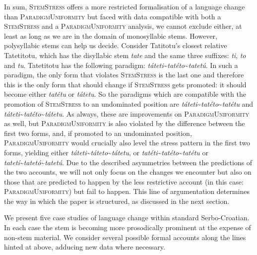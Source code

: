 \documentclass[output=paper,modfonts,nonflat
]{langsci/langscibook}
\begin{document}
In sum, \textsc{StemStress} offers a more restricted formalisation of a language change than \textsc{ParadigmUniformity} but faced with data compatible with both a \textsc{StemStress} and a \textsc{ParadigmUniformity} analysis, we cannot exclude either, at least as long as we are in the domain of monosyllabic stems. However, polysyllabic stems can help us decide. Consider Tatitotu's closest relative Tatetitotu, which has the disyllabic stem \textit{tate} and the same three suffixes: \textit{ti}, \textit{to} and \textit{tu}. Tatetitotu has the following paradigm:  \textit{táteti}\textasciitilde{}\textit{tatéto}\textasciitilde{}\textit{tatetú}. In such a paradigm, the only form that violates \textsc{StemStress}  is the last one and therefore this is the only form that should change if \textsc{StemStress} gets promoted: it should become either \textit{tatétu} or \textit{tátetu}. So the paradigms which are compatible with the promotion of \textsc{StemStress} to an undominated position are \textit{táteti}\textasciitilde{}\textit{tatéto}\textasciitilde{}\textit{tatétu} and \textit{táteti}\textasciitilde{}\textit{tatéto}\textasciitilde{}\textit{tátetu}. As always, these are improvements on \textsc{ParadigmUni\-formity} as well, but \textsc{ParadigmUniformity} is also violated by the difference between the first two forms, and, if promoted to an undominated position, \textsc{ParadigmUniformity} would crucially also level the stress pattern in the first two forms, yielding either \textit{táteti}\textasciitilde{}\textit{táteto}\textasciitilde{}\textit{tátetu}, or \textit{tatéti}\textasciitilde{}\textit{tatéto}\textasciitilde{}\textit{tatétu} or \textit{tatetí}\textasciitilde{}\textit{tatetó}\textasciitilde{}\textit{tatetú}. Due to the described asymmetries between the predictions of the two accounts, we will not only focus on the changes we encounter but also on those that are predicted to happen by the less restrictive account (in this case: \textsc{ParadigmUniformity}) but fail to happen. This line of argumentation determines the way in which the paper is structured, as discussed in the next section. 

We present five case studies of language change within standard Serbo-Croatian. In each case the stem is becoming more prosodically prominent at the expense of non-stem material. We consider several possible formal accounts along the lines hinted at above, adducing new data where necessary.
\end{document}
